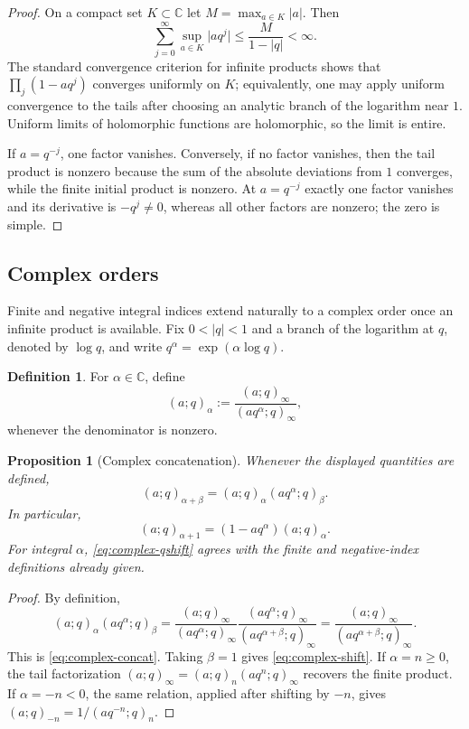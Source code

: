 \documentclass[11pt,oneside,openany]{book}
\newtheorem{proposition}[proposition]{Proposition}
\theoremstyle{definition}
\newtheorem{definition}[definition]{Definition}
\theoremstyle{remark}
\newcommand{\C}{\mathbb C}
\newcommand{\abs}[1]{\lvert #1\rvert}
\begin{document}
\begin{proof}
On a compact set $K\subset\C$ let $M=\max_{a\in K}\abs a$.  Then
\[
 \sum_{j=0}^{\infty}\sup_{a\in K}\abs{a q^j}
 \le \frac{M}{1-\abs q}<\infty.
\]
The standard convergence criterion for infinite products shows that
\(
 \prod_j(1-aq^j)
\)
converges uniformly on $K$; equivalently, one may apply uniform convergence to the tails after choosing an analytic branch of the logarithm near $1$.  Uniform limits of holomorphic functions are holomorphic, so the limit is entire.

If $a=q^{-j}$, one factor vanishes.  Conversely, if no factor vanishes, then the tail product is nonzero because the sum of the absolute deviations from $1$ converges, while the finite initial product is nonzero.  At $a=q^{-j}$ exactly one factor vanishes and its derivative is $-q^j\ne0$, whereas all other factors are nonzero; the zero is simple.
\end{proof}

\subsection{Complex orders}

Finite and negative integral indices extend naturally to a complex order once an infinite product is available.  Fix $0<\abs q<1$ and a branch of the logarithm at $q$, denoted by $\log q$, and write $q^\alpha=\exp(\alpha\log q)$.

\begin{definition}\label{def:complex-qshift}
For $\alpha\in\C$, define
\[
 (a;q)_\alpha
 :=\frac{(a;q)_\infty}{(aq^\alpha;q)_\infty},
 \tag{1.1}\label{eq:complex-qshift}
\]
whenever the denominator is nonzero.
\end{definition}

\begin{proposition}[Complex concatenation]\label{prop:complex-concat}
Whenever the displayed quantities are defined,
\[
 (a;q)_{\alpha+\beta}
 =(a;q)_\alpha(aq^\alpha;q)_\beta.
 \tag{1.2}\label{eq:complex-concat}
\]
In particular,
\[
 (a;q)_{\alpha+1}=(1-aq^\alpha)(a;q)_\alpha.
 \tag{1.3}\label{eq:complex-shift}
\]
For integral $\alpha$, \eqref{eq:complex-qshift} agrees with the finite and negative-index definitions already given.
\end{proposition}

\begin{proof}
By definition,
\[
 (a;q)_\alpha(aq^\alpha;q)_\beta
 =\frac{(a;q)_\infty}{(aq^\alpha;q)_\infty}
  \frac{(aq^\alpha;q)_\infty}{(aq^{\alpha+\beta};q)_\infty}
 =\frac{(a;q)_\infty}{(aq^{\alpha+\beta};q)_\infty}.
\]
This is \eqref{eq:complex-concat}.  Taking $\beta=1$ gives \eqref{eq:complex-shift}.  If $\alpha=n\ge0$, the tail factorization
\(
 (a;q)_\infty=(a;q)_n(aq^n;q)_\infty
\)
recovers the finite product.  If $\alpha=-n<0$, the same relation, applied after shifting by $-n$, gives
\(
 (a;q)_{-n}=1/(aq^{-n};q)_n.
\)
\end{proof}
\end{document}
